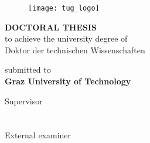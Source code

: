 \newcommand{\thesistext}{DOCTORAL THESIS}
\newcommand{\titletext}{Doktor der technischen Wissenschaften}

\newcommand{\offsetII}{\vspace*{0.1cm}}
\newcommand{\offsetIII}{\vspace*{0.5cm}}
\begin{titlepage}
\centering
\large
\begin{figure}
	\centering
	\texttt{[image: tug\_logo]}
\end{figure}

\vspace*{.5cm}%
\LARGE{\authorname}

\vspace*{1.2cm}%
\textbf{\huge\titlename}
\vspace{1.3cm}%

\Large{\textbf{\thesistext}}\\\vspace*{0.3cm}
\large
to achieve the university degree of\\
\titletext\\
\vspace*{1.3cm}

submitted to\\
\Large{\textbf{Graz University of Technology}}\\

\vspace*{1.5cm}

\large
{Supervisor}\\
\vspace*{3mm}
\supervisorI\\
\addressI\\
\vspace*{6mm}
{External examiner}\\
\vspace*{3mm}
\supervisorII\\
\addressII
\offsetIII\\
\normalsize \phddate\\
\end{titlepage}
